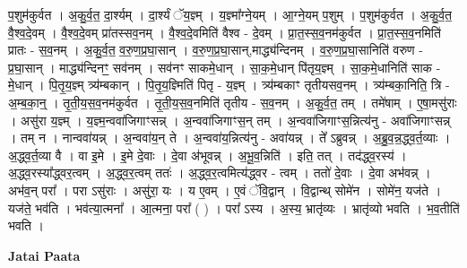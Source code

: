 \documentclass[17pt]{extarticle}
\begin{document}
प॒शुम॑कुर्वत । अ॒कु॒र्व॒त॒ दा॒र्श्यम् । दा॒र्श्यं ॅय॒ज्ञ्म् । य॒ज्ञ्मा᳚ग्ने॒यम् । आ॒ग्ने॒यम् प॒शुम् । प॒शुम॑कुर्वत । अ॒कु॒र्व॒त॒ वै॒श्व॒दे॒वम् । वै॒श्व॒दे॒वम् प्रा॑तस्सव॒नम् । वै॒श्व॒दे॒वमिति॑ वैश्व - दे॒वम् । प्रा॒त॒स्स॒व॒नम॑कुर्वत । प्रा॒त॒स्स॒व॒नमिति॑ प्रातः - स॒व॒नम् । अ॒कु॒र्व॒त॒ व॒रु॒ण॒प्र॒घा॒सान् । व॒रु॒ण॒प्र॒घा॒सान्,माद्ध्य॑न्दिनम् । व॒रु॒ण॒प्र॒घा॒सानिति॑ वरुण - प्र॒घा॒सान् । माद्ध्य॑न्दिनꣳ॒॒ सव॑नम् । सव॑नꣳ साकमे॒धान् । सा॒क॒मे॒धान् पि॑तृय॒ज्ञ्म् । सा॒क॒मे॒धानिति॑ साक - मे॒धान् । पि॒तृ॒य॒ज्ञ्म् त्र्य॑म्बकान् । पि॒तृ॒य॒ज्ञ्मिति॑ पितृ - य॒ज्ञ्म् । त्र्य॑म्बकाꣳ तृतीयसव॒नम् । त्र्य॑म्बका॒निति॒ त्रि - अ॒म्ब॒का॒न्॒ । तृ॒ती॒य॒स॒व॒नम॑कुर्वत । तृ॒ती॒य॒स॒व॒नमिति॑ तृतीय - स॒व॒नम् । अ॒कु॒र्व॒त॒ तम् । तमे॑षाम् । ए॒षा॒मसु॑राः । असु॑रा य॒ज्ञ्म् । य॒ज्ञ्म॒न्ववा॑जिगाꣳसन्न् । अ॒न्ववा॑जिगाꣳस॒न् तम् । अ॒न्ववा॑जिगाꣳस॒न्नित्य॑नु - अवा॑जिगाꣳसन्न् । तम् न । नान्ववा॑यन्न् । अ॒न्ववा॑य॒न् ते । अ॒न्ववा॑य॒न्नित्य॑नु - अवा॑यन्न् । ते᳚ ऽब्रुवन्न् । अ॒ब्रु॒व॒न्न॒द्ध्व॒र्त॒व्याः । अ॒द्ध्व॒र्त॒व्या वै । वा इ॒मे । इ॒मे दे॒वाः । दे॒वा अ॑भूवन्न् । अ॒भू॒व॒न्निति॑ । इति॒ तत् । तद॑द्ध्व॒रस्य॑ । अ॒द्ध्व॒रस्या᳚द्ध्वर॒त्वम् । अ॒द्ध्व॒र॒त्वम् ततः॑ । अ॒द्ध्व॒र॒त्वमित्य॑द्ध्वर - त्वम् । ततो॑ दे॒वाः । दे॒वा अभ॑वन्न् । अभ॑व॒न् परा᳚ । परा ऽसु॑राः । असु॑रा॒ यः । य ए॒वम् । ए॒वं ॅवि॒द्वान् । वि॒द्वान्थ् सोमे॑न । सोमे॑न॒ यज॑ते । यज॑ते॒ भव॑ति । भव॑त्या॒त्मना᳚ । आ॒त्मना॒ परा᳚ ( ) । परा᳚ ऽस्य । अ॒स्य॒ भ्रातृ॑व्यः । भ्रातृ॑व्यो भवति । भ॒व॒तीति॑ भवति । \newline

\textbf{Jatai Paata} \newline
\end{document}
